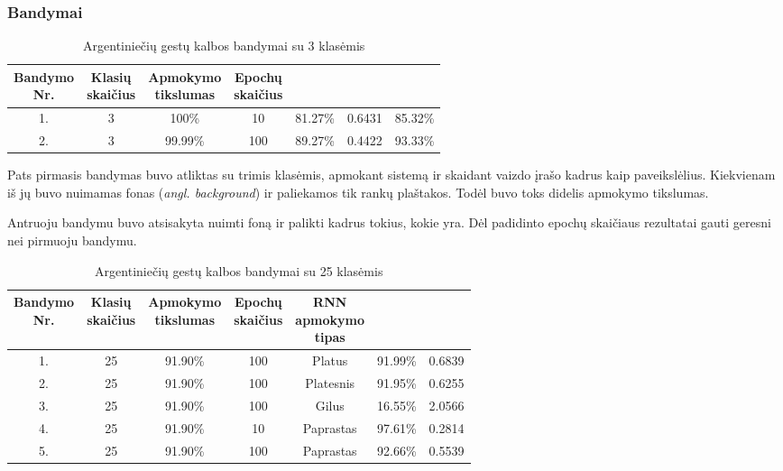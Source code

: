 \documentclass{VUMIFPSbakalaurinis}
\begin{document}
\subsubsection{Bandymai}
\begin{table}[H]\footnotesize
	\centering
	\caption{Argentiniečių gestų kalbos bandymai su 3 klasėmis}
	{\begin{tabular}{| c | c | c | c | c | c | c |} \hline
		\thead{Bandymo\\Nr.} & \thead{Klasių\\skaičius} & \thead{Apmokymo\\tikslumas} & \thead{Epochų\\skaičius} & \thead{Tikslumas} & \thead{Praradimas} & \thead{Testavimas}  \\
		\hline
		1. & 3 & 100\% & 10 & 81.27\% & 0.6431 & 85.32\% \\
		\hline
		2. & 3 & 99.99\% & 100 & 89.27\% & 0.4422 & 93.33\% \\
		\hline
	\end{tabular}}
	\label{tab:asl-bandymai1}
\end{table}

Pats pirmasis bandymas buvo atliktas su trimis klasėmis, apmokant sistemą ir skaidant vaizdo įrašo kadrus kaip paveikslėlius. Kiekvienam iš jų buvo nuimamas fonas (\textit{angl. background}) ir paliekamos tik rankų plaštakos. Todėl buvo toks didelis apmokymo tikslumas.

Antruoju bandymu buvo atsisakyta nuimti foną ir palikti kadrus tokius, kokie yra. Dėl padidinto epochų skaičiaus rezultatai gauti geresni nei pirmuoju bandymu.

\begin{table}[H]\footnotesize
	\centering
	\caption{Argentiniečių gestų kalbos bandymai su 25 klasėmis}
	{\begin{tabular}{| c | c | c | c | c | c | c |} \hline
		\thead{Bandymo\\Nr.} & \thead{Klasių\\skaičius} & \thead{Apmokymo\\tikslumas} & \thead{Epochų\\skaičius} & \thead{RNN\\apmokymo\\tipas} & \thead{Tikslumas} & \thead{Praradimas}  \\
		\hline
		1. & 25 & 91.90\% & 100 & Platus & 91.99\% & 0.6839 \\
		\hline
		2. & 25 & 91.90\% & 100 & Platesnis & 91.95\% & 0.6255 \\
		\hline
		3. & 25 & 91.90\% & 100 & Gilus & 16.55\% & 2.0566 \\
		\hline
		4. & 25 & 91.90\% & 10 & Paprastas & 97.61\% & 0.2814 \\
		\hline
		5. & 25 & 91.90\% & 100 & Paprastas & 92.66\% & 0.5539 \\
		\hline
	\end{tabular}}
	\label{tab:asl-bandymai2}
\end{table}
\end{document}
